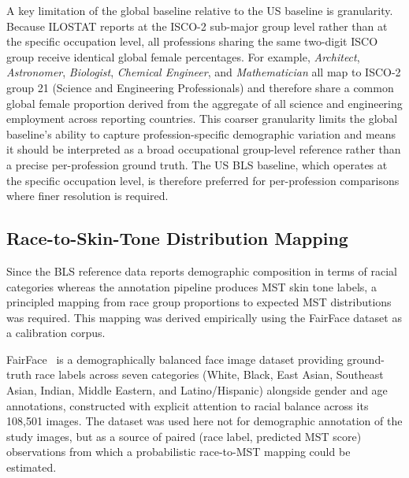 A key limitation of the global baseline relative to the US baseline is granularity.
Because ILOSTAT reports at the ISCO-2 sub-major group level rather than at the specific
occupation level, all professions sharing the same two-digit ISCO group receive
identical global female percentages. For example, \textit{Architect},
\textit{Astronomer}, \textit{Biologist}, \textit{Chemical Engineer}, and
\textit{Mathematician} all map to ISCO-2 group 21 (Science and Engineering
Professionals) and therefore share a common global female proportion derived from the
aggregate of all science and engineering employment across reporting countries. This
coarser granularity limits the global baseline's ability to capture profession-specific
demographic variation and means it should be interpreted as a broad occupational
group-level reference rather than a precise per-profession ground truth. The US BLS
baseline, which operates at the specific occupation level, is therefore preferred for
per-profession comparisons where finer resolution is required.



\subsection{Race-to-Skin-Tone Distribution Mapping}
\label{subsec:race_to_mst}

Since the BLS reference data reports demographic composition in terms of racial
categories whereas the annotation pipeline produces MST skin tone labels, a principled
mapping from race group proportions to expected MST distributions was required. This
mapping was derived empirically using the FairFace dataset as a calibration corpus.

FairFace~\cite{karkkainen2021fairface} is a demographically balanced face image dataset
providing ground-truth race labels across seven categories (White, Black, East Asian,
Southeast Asian, Indian, Middle Eastern, and Latino/Hispanic) alongside gender and age
annotations, constructed with explicit attention to racial balance across its 108,501
images. The dataset was used here not for demographic annotation of the study images,
but as a source of paired (race label, predicted MST score) observations from which a
probabilistic race-to-MST mapping could be estimated.

